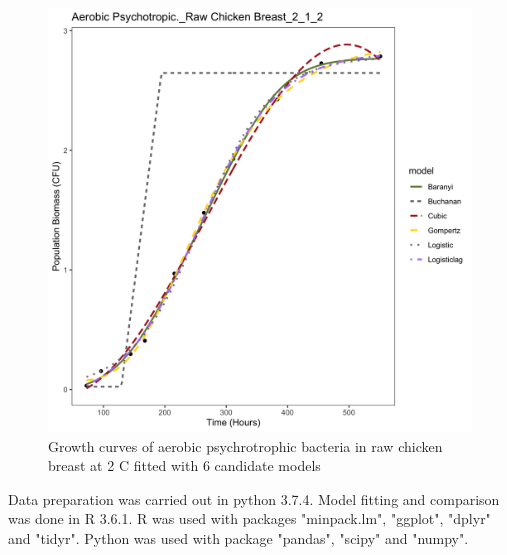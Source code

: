 \documentclass[a4paper,11pt]{article}
\theoremstyle{definition}
\begin{document}
\begin{figure}[!ht]
            \centering
                \begin{center}
                    \includegraphics[width=\linewidth]{../results/example.png}
                     \caption{Growth curves of aerobic psychrotrophic bacteria in raw chicken breast at 2 \textdegree C fitted with 6 candidate models}
                \end{center}
        \end{figure}
Data preparation was carried out in python 3.7.4. Model fitting and comparison was done in R 3.6.1. R was used with packages "minpack.lm", "ggplot", "dplyr" and "tidyr". Python was used with package "pandas", "scipy" and "numpy". 
\end{document}
